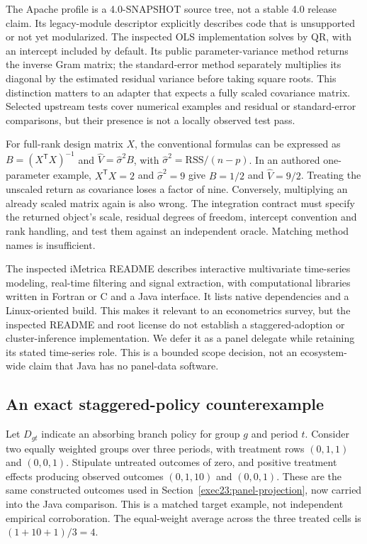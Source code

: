 The Apache profile is a 4.0-SNAPSHOT source tree, not a stable 4.0 release
claim. Its legacy-module descriptor explicitly describes code that is unsupported
or not yet modularized. The inspected OLS implementation solves by QR, with
an intercept included by default. Its public parameter-variance method returns
the inverse Gram matrix; the standard-error method separately multiplies its
diagonal by the estimated residual variance before taking square roots. This
distinction matters to an adapter that expects a fully scaled covariance matrix.
Selected upstream tests cover numerical examples and residual or standard-error
comparisons, but their presence is not a locally observed test pass.
\citep{exec25_paneljava_commons}

For full-rank design matrix $X$, the conventional formulas can be expressed
as $B=(X^\mathsf{T}X)^{-1}$ and $\widehat V=\widehat\sigma^2 B$, with
$\widehat\sigma^2=\mathrm{RSS}/(n-p)$. In an authored one-parameter
example, $X^\mathsf{T}X=2$ and $\widehat\sigma^2=9$ give $B=1/2$ and
$\widehat V=9/2$. Treating the unscaled return as covariance loses a factor
of nine. Conversely, multiplying an already scaled matrix again is also wrong.
The integration contract must specify the returned object's scale, residual
degrees of freedom, intercept convention and rank handling, and test them
against an independent oracle. Matching method names is insufficient.
\citep{exec25_paneljava_reference}

The inspected iMetrica README describes interactive multivariate time-series
modeling, real-time filtering and signal extraction, with computational
libraries written in Fortran or C and a Java interface. It lists native
dependencies and a Linux-oriented build. This makes it relevant to an
econometrics survey, but the inspected README and root license do not
establish a staggered-adoption or cluster-inference implementation. We defer
it as a panel delegate while retaining its stated time-series role. This is
a bounded scope decision, not an ecosystem-wide claim that Java has no
panel-data software.~\citep{exec25_paneljava_imetrica}

\subsection{An exact staggered-policy counterexample}
Let $D_{gt}$ indicate an absorbing branch policy for group $g$ and period $t$.
Consider two equally weighted groups over three periods, with treatment rows
$(0,1,1)$ and $(0,0,1)$. Stipulate untreated outcomes of zero, and positive
treatment effects producing observed outcomes $(0,1,10)$ and $(0,0,1)$.
These are the same constructed outcomes used in
Section~\ref{exec23:panel-projection}, now carried into the Java comparison.
This is a matched target example, not independent empirical corroboration.
The equal-weight average across the three treated cells is $(1+10+1)/3=4$.
\citep{exec25_paneljava_reference}

